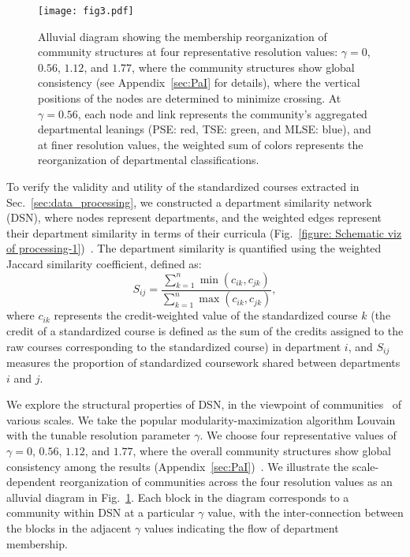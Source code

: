 \documentclass{bmcart}
\begin{document}
\begin{figure}
\centering
\texttt{[image: fig3.pdf]} 
\caption{Alluvial diagram showing the membership reorganization of community structures at four representative resolution values: $\gamma = 0$, $0.56$, $1.12$, and $1.77$, where the community structures show global consistency (see Appendix~\ref{sec:PaI} for details), 
where the vertical positions of the nodes are determined to minimize crossing.
At $\gamma = 0.56$, each node and link represents the community's aggregated departmental leanings (PSE: red, TSE: green, and MLSE: blue), and at finer resolution values, the weighted sum of colors represents the reorganization of departmental classifications.}
\label{figure: department similarity network}
\end{figure}

To verify the validity and utility of the standardized courses extracted in Sec.~\ref{sec:data_processing}, we constructed a department similarity network (DSN), where nodes represent departments, and the weighted edges represent their department similarity in terms of their curricula (Fig.~\ref{figure: Schematic viz of processing-1})~\cite{NewmanBook,WeightedNetwork}. The department similarity is quantified using the weighted Jaccard similarity coefficient, defined as:
\begin{equation}
S_{ij} = \frac{\displaystyle \sum_{k=1}^{n} \min(c_{ik}, c_{jk})}{\displaystyle \sum_{k=1}^{n} \max(c_{ik}, c_{jk})},
\label{eq:S}
\end{equation}
where \( c_{ik} \) represents the credit-weighted value of the standardized course \( k \) (the credit of a standardized course is defined as the sum of the credits assigned to the raw courses corresponding to the standardized course) in department \( i \), and \( S_{ij} \) measures the proportion of standardized coursework shared between departments \( i \) and \( j \). 

We explore the structural properties of DSN, in the viewpoint of communities~\cite{Porter2009,Fortunato2010} of various scales. We take the popular modularity-maximization algorithm Louvain~\cite{Blondel2008} with the tunable resolution parameter $\gamma$. We choose four representative values of $\gamma = 0$, $0.56$, $1.12$, and $1.77$, where the overall community structures show global consistency among the results (Appendix~\ref{sec:PaI})~\cite{PhysRevE.103.052306}. We illustrate the scale-dependent reorganization of communities across the four resolution values as an alluvial diagram in Fig.~\ref{figure: department similarity network}.
Each block in the diagram corresponds to a community within DSN at a particular $\gamma$ value, with the inter-connection between the blocks in the adjacent $\gamma$ values indicating the flow of department membership. 
\end{document}
